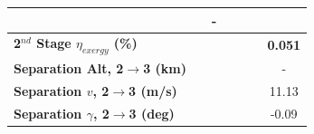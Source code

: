 \begin{table}[ht]
\begin{tabular}{l c c c c c c}
		& \firstsecondSeparationgammaIspOneHundredTen
		& -
		\\
		\hline 
		\textbf{2$^{nd}$ Stage $\eta_{exergy}$ (\%)}
		& \textbf{\secondExergyEffIspNinety}
		& \textbf{\secondExergyEffIspNinetyFive}
		& \textbf{\secondExergyEffIspStandard}
		& \textbf{\secondExergyEffIspOneHundredFive}
		& \textbf{\secondExergyEffIspOneHundredTen}
		& \textbf{0.051}
		\\
		\textbf{Separation Alt, 2$\rightarrow$3 (km)}
		& \secondthirdSeparationAltIspNinety
		& \secondthirdSeparationAltIspNinetyFive
		& \secondthirdSeparationAltIspStandard
		& \secondthirdSeparationAltIspOneHundredFive
		& \secondthirdSeparationAltIspOneHundredTen
		& -
		\\
		\textbf{Separation $v$, 2$\rightarrow$3 (m/s)}
		& \secondthirdSeparationvIspNinety
		& \secondthirdSeparationvIspNinetyFive
		& \secondthirdSeparationvIspStandard
		& \secondthirdSeparationvIspOneHundredFive
		& \secondthirdSeparationvIspOneHundredTen
		&11.13
		\\
		\textbf{Separation $\gamma$, 2$\rightarrow$3 (deg)}
		& \secondthirdSeparationgammaIspNinety
		& \secondthirdSeparationgammaIspNinetyFive
		& \secondthirdSeparationgammaIspStandard
		& \secondthirdSeparationgammaIspOneHundredFive
		& \secondthirdSeparationgammaIspOneHundredTen
		&-0.09
		\\
	

\end{tabular}
\end{table}

